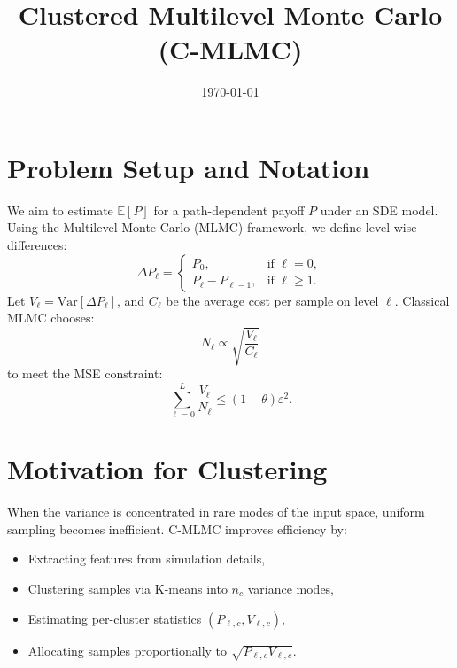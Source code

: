 \documentclass{article}
\title{Clustered Multilevel Monte Carlo (C-MLMC)}
\date{\today}
\begin{document}
\maketitle

\section{Problem Setup and Notation}
We aim to estimate \( \mathbb{E}[P] \) for a path-dependent payoff \( P \) under an SDE model. Using the Multilevel Monte Carlo (MLMC) framework, we define level-wise differences:
\[
\Delta P_\ell =
\begin{cases}
P_0, & \text{if } \ell = 0, \\
P_\ell - P_{\ell-1}, & \text{if } \ell \ge 1.
\end{cases}
\]
Let \( V_\ell = \mathrm{Var}[\Delta P_\ell] \), and \( C_\ell \) be the average cost per sample on level \( \ell \). Classical MLMC chooses:
\[
N_\ell \propto \sqrt{\frac{V_\ell}{C_\ell}}
\]
to meet the MSE constraint:
\[
\sum_{\ell=0}^L \frac{V_\ell}{N_\ell} \le (1 - \theta)\varepsilon^2.
\]

\section{Motivation for Clustering}
When the variance is concentrated in rare modes of the input space, uniform sampling becomes inefficient. C-MLMC improves efficiency by:
\begin{itemize}
  \item Extracting features from simulation details,
  \item Clustering samples via K-means into \( n_c \) variance modes,
  \item Estimating per-cluster statistics \( (P_{\ell,c}, V_{\ell,c}) \),
  \item Allocating samples proportionally to \( \sqrt{P_{\ell,c} V_{\ell,c}} \).
\end{itemize}
\end{document}
